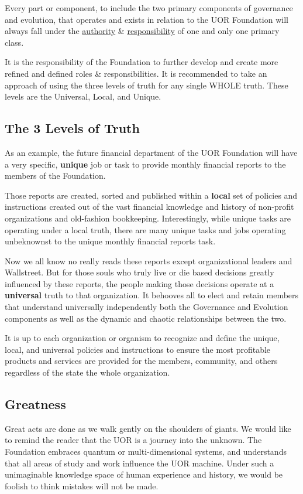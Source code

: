 \documentclass[twocolumn,10pt]{article}
\begin{document}
Every part or component, to include the two primary components of governance and evolution, that operates and exists in relation to the UOR Foundation will always fall under the \underline{authority} \& \underline{responsibility} of one and only one primary class.

It is the responsibility of the Foundation to further develop and create more refined and defined roles \& responsibilities.
It is recommended to take an approach of using the three levels of truth for any single WHOLE truth.
These levels are the Universal, Local, and Unique.

\subsection*{The 3 Levels of Truth}
As an example, the future financial department of the UOR Foundation will have a very specific, \textbf{unique} job or task to provide monthly financial reports to the members of the Foundation.

Those reports are created, sorted and published within a \textbf{local} set of policies and instructions created out of the vast financial knowledge and history of non-profit organizations and old-fashion bookkeeping.
Interestingly, while unique tasks are operating under a local truth, there are many unique tasks and jobs operating unbeknownst to the unique monthly financial reports task.

Now we all know no really reads these reports except organizational leaders and Wallstreet.
But for those souls who truly live or die based decisions greatly influenced by these reports, the people making those decisions operate at a \textbf{universal} truth to that organization.
It behooves all to elect and retain members that understand universally independently both the Governance and Evolution components as well as the dynamic and chaotic relationships between the two.

It is up to each organization or organism to recognize and define the unique, local, and universal policies and instructions to ensure the most profitable products and services are provided for the members, community, and others regardless of the state the whole organization.

\subsection*{Greatness}
Great acts are done as we walk gently on the shoulders of giants.
We would like to remind the reader that the UOR is a journey into the unknown.
The Foundation embraces quantum or multi-dimensional systems, and understands that all areas of study and work influence the UOR machine.
Under such a unimaginable knowledge space of human experience and history, we would be foolish to think mistakes will not be made.
\end{document}
